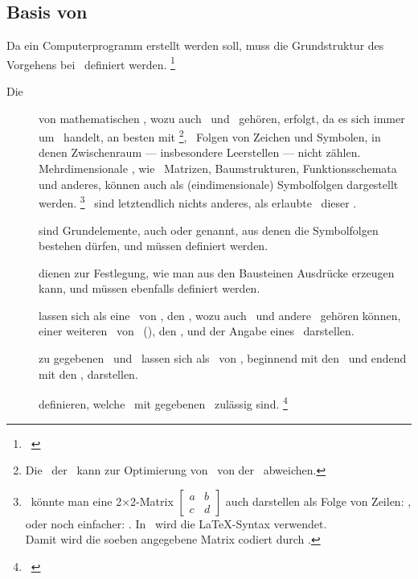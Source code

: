 \begin{offen}%

\section[Basis von Beweisen]{Basis von \Beweisen}%
\label                             {sec:BeweisBasis}

Da ein Computerprogramm erstellt werden soll, muss die Grundstruktur des Vorgehens bei \Beweisen\ definiert werden.%
\footnote{\seename~\cite{bib:Kalkuel}}

\begin{description}
	\item[Die \logischeDarstellung] von mathematischen \Aussagen, wozu auch \Axiome\ und \Saetze\ gehören, erfolgt, da es sich immer um \Formeln\ handelt, an besten mit \Symbolfolgen%
	\footnote{%
		Die \interneDarstellung\ der \Symbolfolgen\ kann zur Optimierung von \ASBA\ von der \logischenD\ abweichen.
	},
	\textdh\ Folgen von Zeichen und Symbolen, in denen Zwischenraum --- insbesondere Leerstellen --- nicht zählen.
	Mehrdimensionale \Formeln, wie \textzB\ Matrizen, Baumstrukturen, Funktionsschemata und anderes, können auch als (eindimensionale) Symbolfolgen dargestellt werden.%
	\footnote{%
		\textZB\ könnte man eine 2$\times$2-Matrix
		$\begin{bmatrix} a & b \\ c & d \end{bmatrix}$
		auch darstellen als Folge von Zeilen: \seqqt{$[(a,b),(c,d)]$}, oder noch einfacher: \seqqt{$[a,b;c,d]$}.
		In \ASBA\ wird die \LaTeX-Syntax verwendet.
		\\Damit wird die soeben angegebene Matrix codiert durch .
	}
	\Beweise\ sind letztendlich nichts anderes, als erlaubte \Transformationen\ dieser \Symbolfolgen.
	\item[\Bausteine] sind Grundelemente, auch  oder  genannt, aus denen die Symbolfolgen bestehen dürfen, und müssen definiert werden.
	\item[\Formationsregeln] dienen zur Festlegung, wie man aus den Bausteinen Ausdrücke erzeugen kann, und müssen ebenfalls definiert werden.
	\item[\Saetze] lassen sich als eine \Menge\ von \Formeln, den \Praemissen, wozu auch \Axiome\ und andere \Saetze\ gehören können, einer weiteren \Menge\ von \Formeln\ (\Symbolfolgen), den \Konklusionen, und der Angabe eines \Beweises\ darstellen.
	\item[\Beweise] zu gegebenen \Praemissen\ und \Konklusionen\ lassen sich als \Folge\ von \Transformationen, beginnend mit den \Praemissen\ und endend mit den \Konklusionen, darstellen.
	\item[\Transformationsregeln] definieren, welche \Transformationen\ mit gegebenen \Formelmengen\ zulässig sind.%
	\footnote{\seename~\cite{bib:Rautenberg,bib:Schlussregel,bib:NatuerlichesSchliessen}}
\end{description}

\end{offen}%

\Endchapter

